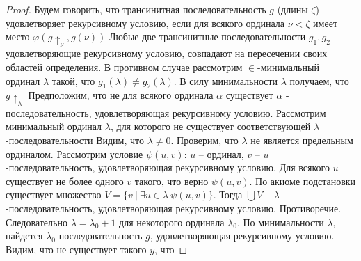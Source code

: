 \begin{proof}
Будем говорить, что трансинитная последовательность $g$ (длины $\zeta$) удовлетворяет рекурсивному условию, если для всякого ординала $\nu < \zeta$ имеет место $\varphi(g \uparrow_{\nu}, g(\nu))$
\vskip 0.1in
Любые две трансинитные последовательности $g_1, g_2$ удовлетворяющие рекурсивному условию, совпадают на пересечении своих областей определения. В противном случае рассмотрим $\in$-минимальный ординал $\lambda$ такой, что $g_1(\lambda) \ne g_2(\lambda)$. В силу минимальности $\lambda$ получаем, что $g \uparrow_{\lambda}$
\vskip 0.1in
Предположим, что не для всякого ординала $\alpha$ существует $\alpha$ - последовательность, удовлетворяющая рекурсивному условию. Рассмотрим минимальный ординал $\lambda$, для которого не существует соответствующей $\lambda$-последовательности
\vskip 0.1in
Видим, что $\lambda \ne 0$. Проверим, что $\lambda$ не является предельным ординалом. Рассмотрим условие $\psi(u,v)$: $u$ -- ординал, $v$ -- $u$-последовательность, удовлетворяющая рекурсивному условию.
\vskip 0.1in
Для всякого $u$ существует не более одного $v$ такого, что верно $\psi(u,v)$. По акиоме подстановки существует множество $V = \{v\ |\ \exists u \in \lambda\ \psi(u,v)\}$. Тогда $\bigcup V$ -- $\lambda$-последовательность, удовлетворяющая рекурсивному условию. Противоречие.
\vskip 0.1in
Следовательно $\lambda = \lambda_0 + 1$ для некоторого ординала $\lambda_0$. По минимальности $\lambda$, найдется $\lambda_0$-последовательность $g$, удовлетворяющая рекурсивному условию. Видим, что не существует такого $y$, что 
\end{proof}

